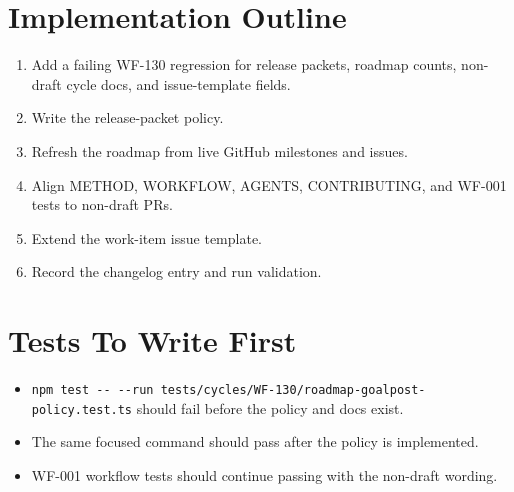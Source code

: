 \section{Implementation Outline}\label{record-212-implementation-outline}

\begin{enumerate}
\def\labelenumi{\arabic{enumi}.}
\tightlist
\item
  Add a failing WF-130 regression for release packets, roadmap counts, non-draft cycle docs, and issue-template fields.
\item
  Write the release-packet policy.
\item
  Refresh the roadmap from live GitHub milestones and issues.
\item
  Align METHOD, WORKFLOW, AGENTS, CONTRIBUTING, and WF-001 tests to non-draft PRs.
\item
  Extend the work-item issue template.
\item
  Record the changelog entry and run validation.
\end{enumerate}

\section{Tests To Write First}\label{record-212-tests-to-write-first}

\begin{itemize}
\tightlist
\item
  \texttt{n\allowbreak{}p\allowbreak{}m\allowbreak{} \allowbreak{}t\allowbreak{}e\allowbreak{}s\allowbreak{}t\allowbreak{} \allowbreak{}-\allowbreak{}-\allowbreak{} \allowbreak{}-\allowbreak{}-\allowbreak{}r\allowbreak{}u\allowbreak{}n\allowbreak{} \allowbreak{}t\allowbreak{}e\allowbreak{}s\allowbreak{}t\allowbreak{}s\allowbreak{}/\allowbreak{}c\allowbreak{}y\allowbreak{}c\allowbreak{}l\allowbreak{}e\allowbreak{}s\allowbreak{}/\allowbreak{}W\allowbreak{}F\allowbreak{}-\allowbreak{}1\allowbreak{}3\allowbreak{}0\allowbreak{}/\allowbreak{}r\allowbreak{}o\allowbreak{}a\allowbreak{}d\allowbreak{}m\allowbreak{}a\allowbreak{}p\allowbreak{}-\allowbreak{}g\allowbreak{}o\allowbreak{}a\allowbreak{}l\allowbreak{}p\allowbreak{}o\allowbreak{}s\allowbreak{}t\allowbreak{}-\allowbreak{}p\allowbreak{}o\allowbreak{}l\allowbreak{}i\allowbreak{}c\allowbreak{}y\allowbreak{}.\allowbreak{}t\allowbreak{}e\allowbreak{}s\allowbreak{}t\allowbreak{}.\allowbreak{}t\allowbreak{}s} should fail before the policy and docs exist.
\item
  The same focused command should pass after the policy is implemented.
\item
  WF-001 workflow tests should continue passing with the non-draft wording.
\end{itemize}

